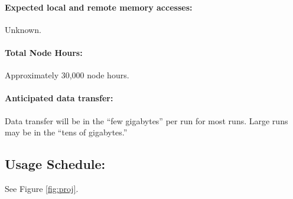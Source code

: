 \documentclass[letterpaper]{article}
\begin{document}
\paragraph{Expected local and remote memory accesses:} Unknown. 
\paragraph{Total Node Hours:} Approximately 30,000 node hours.
\paragraph{Anticipated data transfer:} Data transfer will be in the ``few 
gigabytes'' per run for most runs. Large runs may be in the ``tens of 
gigabytes.''




\subsection{Usage Schedule:} See Figure \ref{fig:proj}.

 



\pagebreak


\end{document}
